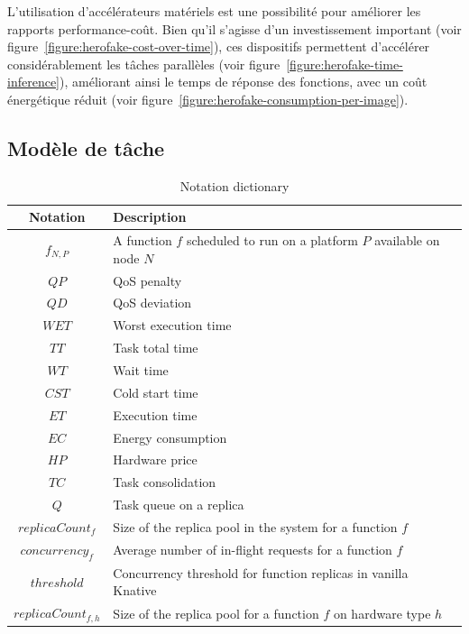 L'utilisation d'accélérateurs matériels est une possibilité pour améliorer les rapports performance-coût. Bien qu'il s'agisse d'un investissement important (voir figure~\ref{figure:herofake-cost-over-time}), ces dispositifs permettent d'accélérer considérablement les tâches parallèles (voir figure~\ref{figure:herofake-time-inference}), améliorant ainsi le temps de réponse des fonctions, avec un coût énergétique réduit (voir figure~\ref{figure:herofake-consumption-per-image}).

\subsection{Modèle de tâche} \label{model:tasks}

\begin{table}[t]
    \caption{Notation dictionary}
    \begin{center}
    \begin{tabular}{|c|L|}
    \hline
    \textbf{Notation} & \textbf{Description} \\ \hline
    $f_{N, P}$ & A function $f$ scheduled to run on a platform $P$ available on node $N$ \\ \hline
    $QP$ & QoS penalty \\ \hline
    $QD$ & QoS deviation \\ \hline
    $WET$ & Worst execution time \\ \hline
    $TT$ & Task total time \\ \hline
    $WT$ & Wait time \\ \hline
    $CST$ & Cold start time \\ \hline
    $ET$ & Execution time \\ \hline
    $EC$ & Energy consumption \\ \hline
    $HP$ & Hardware price \\ \hline
    $TC$ & Task consolidation \\ \hline
    $Q$ & Task queue on a replica \\ \hline
    $replicaCount_{f}$ & Size of the replica pool in the system for a function $f$ \\ \hline
    $concurrency_{f}$ & Average number of in-flight requests for a function $f$ \\ \hline
    $threshold$ & Concurrency threshold for function replicas in vanilla Knative \\ \hline
    $replicaCount_{f, h}$ & Size of the replica pool for a function $f$ on hardware type $h$ \\ \hline

\end{tabular}
\end{center}
\end{table}
